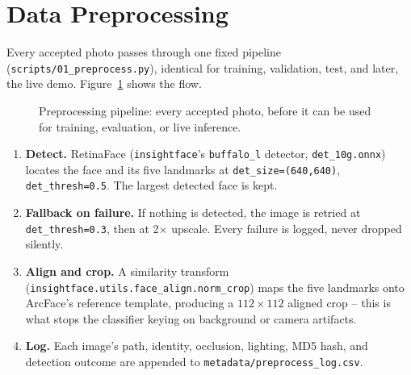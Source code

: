 \documentclass[11pt]{article}
\begin{document}
\section{Data Preprocessing}
\label{sec:preprocessing}

Every accepted photo passes through one fixed pipeline (\texttt{scripts/01\_preprocess.py}), identical for training, validation, test, and later, the live demo. Figure~\ref{fig:preprocess-pipeline} shows the flow.

\begin{figure}[htbp]
\centering
{}
\caption{Preprocessing pipeline: every accepted photo, before it can be used for training, evaluation, or live inference.}
\label{fig:preprocess-pipeline}
\end{figure}

\begin{enumerate}[label=\arabic*.]
\item \textbf{Detect.} RetinaFace (\texttt{insightface}'s \texttt{buffalo\_l} detector, \texttt{det\_10g.onnx}) locates the face and its five landmarks at \texttt{det\_size=(640,640)}, \texttt{det\_thresh=0.5}. The largest detected face is kept.
\item \textbf{Fallback on failure.} If nothing is detected, the image is retried at \texttt{det\_thresh=0.3}, then at 2$\times$ upscale. Every failure is logged, never dropped silently.
\item \textbf{Align and crop.} A similarity transform (\texttt{insightface.utils.face\_align.norm\_crop}) maps the five landmarks onto ArcFace's reference template, producing a $112\times112$ aligned crop -- this is what stops the classifier keying on background or camera artifacts.
\item \textbf{Log.} Each image's path, identity, occlusion, lighting, MD5 hash, and detection outcome are appended to \texttt{metadata/preprocess\_log.csv}.
\end{enumerate}
\end{document}
